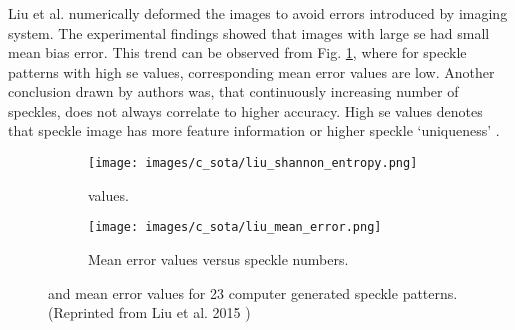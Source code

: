     
    \subsubsection{}



        Liu et al. numerically deformed the images to avoid errors introduced by imaging system. The experimental findings showed that images with large \gls{se} had small mean bias error. This trend can be observed from Fig. \ref{subfig:liu_shannon_entropy.png}, where for speckle patterns with high \gls{se} values, corresponding mean error values are low. Another conclusion drawn by authors was, that continuously increasing number of speckles, does not always correlate to higher accuracy. High \gls{se} values denotes that speckle image has more feature information or higher speckle `uniqueness' \cite{liu_shannon}.

        \begin{figure}[ht] 
            \centering
            \begin{subfigure}{0.49\textwidth}
                \centering
                \texttt{[image: images/c\_sota/liu\_shannon\_entropy.png]}
                \caption{ values.}
                \label{subfig:liu_shannon_entropy.png}
            \end{subfigure}
            \begin{subfigure}{0.49\textwidth}
                \centering
                \texttt{[image: images/c\_sota/liu\_mean\_error.png]}
                \caption{Mean error values versus speckle numbers.}
                \label{subfig:liu_mean_error.png}
            \end{subfigure}
            \caption{ and mean error values for 23 computer generated speckle patterns. (Reprinted from Liu et al. 2015 \cite{liu_shannon})}
            \label{fig:liu_shannon}
        \end{figure}


